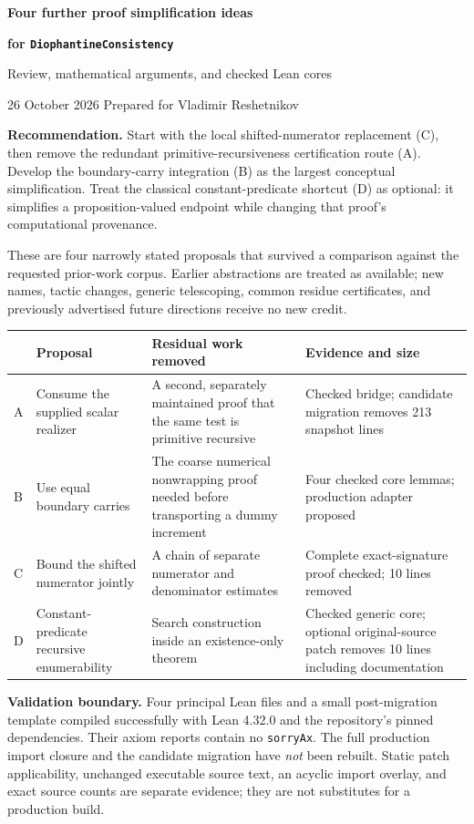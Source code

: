 \documentclass[11pt,a4paper]{article}
\newcommand{\code}[1]{\texttt{\small #1}}
\begin{document}
\thispagestyle{empty}
{\color{ink}\LARGE\bfseries Four further proof simplification ideas}\par
{\Large\bfseries for \texttt{DiophantineConsistency}}\par
\vspace{3mm}
{\large Review, mathematical arguments, and checked Lean cores}\par
26 October 2026 \hfill Prepared for Vladimir Reshetnikov
\vspace{5mm}

\textbf{Recommendation.} Start with the local shifted-numerator replacement (C), then remove the redundant primitive-recursiveness certification route (A). Develop the boundary-carry integration (B) as the largest conceptual simplification. Treat the classical constant-predicate shortcut (D) as optional: it simplifies a proposition-valued endpoint while changing that proof's computational provenance.

These are four narrowly stated proposals that survived a comparison against the requested prior-work corpus. Earlier abstractions are treated as available; new names, tactic changes, generic telescoping, common residue certificates, and previously advertised future directions receive no new credit.

\begin{tabularx}{\textwidth}{@{}L{7mm}L{38mm}YL{34mm}@{}}
\toprule
 & Proposal & Residual work removed & Evidence and size \\
\midrule
A & Consume the supplied scalar realizer & A second, separately maintained proof that the same test is primitive recursive & Checked bridge; candidate migration removes 213 snapshot lines \\
B & Use equal boundary carries & The coarse numerical nonwrapping proof needed before transporting a dummy increment & Four checked core lemmas; production adapter proposed \\
C & Bound the shifted numerator jointly & A chain of separate numerator and denominator estimates & Complete exact-signature proof checked; 10 lines removed \\
D & Constant-predicate recursive enumerability & Search construction inside an existence-only theorem & Checked generic core; optional original-source patch removes 10 lines including documentation \\
\bottomrule
\end{tabularx}

\textbf{Validation boundary.} Four principal Lean files and a small post-migration template compiled successfully with Lean 4.32.0 and the repository's pinned dependencies. Their axiom reports contain no \code{sorryAx}. The full production import closure and the candidate migration have \emph{not} been rebuilt. Static patch applicability, unchanged executable source text, an acyclic import overlay, and exact source counts are separate evidence; they are not substitutes for a production build.
\end{document}
